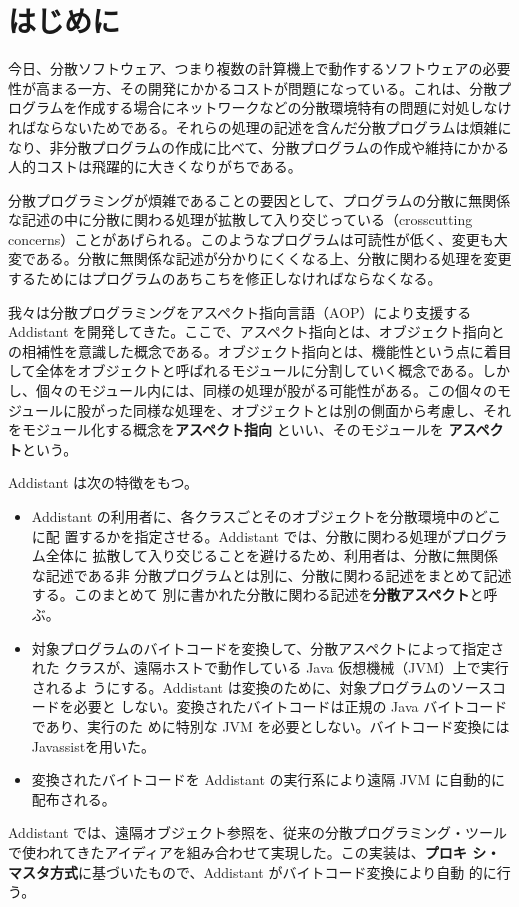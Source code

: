 \chapter{はじめに}

今日、分散ソフトウェア、つまり複数の計算機上で動作するソフトウェアの必要
性が高まる一方、その開発にかかるコストが問題になっている。これは、分散プ
ログラムを作成する場合にネットワークなどの分散環境特有の問題に対処しなけ
ればならないためである。それらの処理の記述を含んだ分散プログラムは煩雑に
なり、非分散プログラムの作成に比べて、分散プログラムの作成や維持にかかる
人的コストは飛躍的に大きくなりがちである。

分散プログラミングが煩雑であることの要因として、プログラムの分散に無関係
な記述の中に分散に関わる処理が拡散して入り交じっている（crosscutting
concerns）ことがあげられる。このようなプログラムは可読性が低く、変更も大
変である。分散に無関係な記述が分かりにくくなる上、分散に関わる処理を変更
するためにはプログラムのあちこちを修正しなければならなくなる。

我々は分散プログラミングをアスペクト指向言語（AOP）により支援する 
Addistant を開発してきた。ここで、アスペクト指向とは、オブジェクト指向と
の相補性を意識した概念である。オブジェクト指向とは、機能性という点に着目
して全体をオブジェクトと呼ばれるモジュールに分割していく概念である。しか
し、個々のモジュール内には、同様の処理が股がる可能性がある。この個々のモ
ジュールに股がった同様な処理を、オブジェクトとは別の側面から考慮し、それ
をモジュール化する概念を{\bf{アスペクト指向}} といい、そのモジュールを
{\bf{アスペクト}}という。

Addistant は次の特徴をもつ。
%
\begin{itemize}
\item{
Addistant の利用者に、各クラスごとそのオブジェクトを分散環境中のどこに配
置するかを指定させる。Addistant では、分散に関わる処理がプログラム全体に
拡散して入り交じることを避けるため、利用者は、分散に無関係な記述である非
分散プログラムとは別に、分散に関わる記述をまとめて記述する。このまとめて
別に書かれた分散に関わる記述を{\bf{分散アスペクト}}と呼ぶ。
}
\item{
対象プログラムのバイトコードを変換して、分散アスペクトによって指定された
クラスが、遠隔ホストで動作している Java 仮想機械（JVM）上で実行されるよ
うにする。Addistant は変換のために、対象プログラムのソースコードを必要と
しない。変換されたバイトコードは正規の Java バイトコードであり、実行のた
めに特別な JVM を必要としない。バイトコード変換には 
Javassistを用いた。
}
\item{
変換されたバイトコードを Addistant の実行系により遠隔 JVM に自動的に
配布される。
}
\end{itemize}
%
\noindent
Addistant では、遠隔オブジェクト参照を、従来の分散プログラミング・ツール
で使われてきたアイディアを組み合わせて実現した。この実装は、{\bf{プロキ
シ・マスタ方式}}に基づいたもので、Addistant がバイトコード変換により自動
的に行う。

